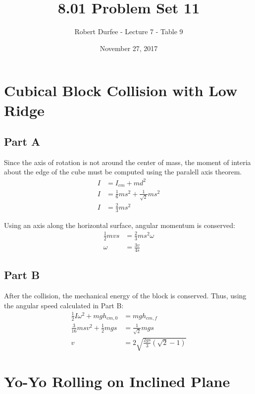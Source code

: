 \documentclass{article}
\title{ 8.01 Problem Set 11 }
\author{ Robert Durfee - Lecture 7 - Table 9 }
\date{ November 27, 2017 }
\begin{document}
\maketitle

\section{ Cubical Block Collision with Low Ridge }

\subsection*{ Part A }

Since the axis of rotation is not around the center of mass, the moment of
interia about the edge of the cube must be computed using the paralell axis
theorem.
\begin{align*}
    I &= I_{cm} + md^{2} \\
    I &= \frac{1}{6} ms^{2} + \frac{1}{\sqrt{ 2 }} ms^{2} \\
    I &= \frac{2}{3} ms^{2}
\end{align*}

Using an axis along the horizontal surface, angular momentum is conserved:
\begin{align*}
    \frac{1}{2} mvs &= \frac{2}{3} ms^{2}\omega \\
    \omega &= \frac{3v}{4s}
\end{align*}

\subsection*{ Part B }

After the collision, the mechanical energy of the block is conserved. Thus,
using the angular speed calculated in Part B:
\begin{align*}
    \frac{1}{2} I\omega^{2} + mgh_{cm,0} &= mgh_{cm,f} \\
    \frac{3}{16} msv^{2} + \frac{1}{2} mgs &= \frac{1}{\sqrt{ 2 }} mgs \\
    v &= 2 \sqrt{ \frac{2gs}{3} \left( \sqrt{ 2 } - 1 \right) }
\end{align*}

\section{ Yo-Yo Rolling on Inclined Plane }
\end{document}
